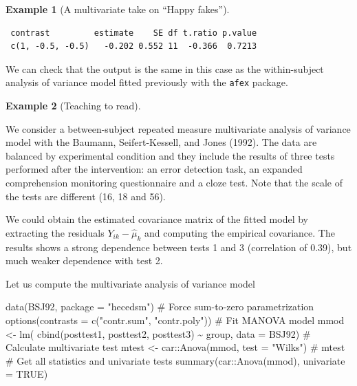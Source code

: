 \documentclass[
  11pt,
  letterpaper,
]{scrbook}
\newenvironment{Shaded}{\begin{snugshade}}{\end{snugshade}}
\newcommand{\AttributeTok}[1]{\textcolor[rgb]{0.40,0.45,0.13}{#1}}
\newcommand{\CommentTok}[1]{\textcolor[rgb]{0.37,0.37,0.37}{#1}}
\newcommand{\ConstantTok}[1]{\textcolor[rgb]{0.56,0.35,0.01}{#1}}
\newcommand{\FunctionTok}[1]{\textcolor[rgb]{0.28,0.35,0.67}{#1}}
\newcommand{\NormalTok}[1]{\textcolor[rgb]{0.00,0.23,0.31}{#1}}
\newcommand{\OtherTok}[1]{\textcolor[rgb]{0.00,0.23,0.31}{#1}}
\newcommand{\SpecialCharTok}[1]{\textcolor[rgb]{0.37,0.37,0.37}{#1}}
\newcommand{\StringTok}[1]{\textcolor[rgb]{0.13,0.47,0.30}{#1}}
\theoremstyle{definition}
\newtheorem{example}{Example}[chapter]
\theoremstyle{definition}
\theoremstyle{remark}
\begin{document}
\begin{example}[A multivariate take on ``Happy
fakes'']
\begin{verbatim}
 contrast         estimate    SE df t.ratio p.value
 c(1, -0.5, -0.5)   -0.202 0.552 11  -0.366  0.7213
\end{verbatim}

We can check that the output is the same in this case as the
within-subject analysis of variance model fitted previously with the
\texttt{afex} package.

\end{example}

\begin{example}[Teaching to
read]\protect\hypertarget{exm-baumann-multi}{}\label{exm-baumann-multi}

We consider a between-subject repeated measure multivariate analysis of
variance model with the Baumann, Seifert-Kessell, and Jones (1992). The
data are balanced by experimental condition and they include the results
of three tests performed after the intervention: an error detection
task, an expanded comprehension monitoring questionnaire and a cloze
test. Note that the scale of the tests are different (16, 18 and 56).

We could obtain the estimated covariance matrix of the fitted model by
extracting the residuals \(Y_{ik} - \widehat{\mu}_k\) and computing the
empirical covariance. The results shows a strong dependence between
tests 1 and 3 (correlation of 0.39), but much weaker dependence with
test 2.

Let us compute the multivariate analysis of variance model

\begin{Shaded}
\begin{Highlighting}[]
\FunctionTok{data}\NormalTok{(BSJ92, }\AttributeTok{package =} \StringTok{"hecedsm"}\NormalTok{)}
\CommentTok{\# Force sum{-}to{-}zero parametrization}
\FunctionTok{options}\NormalTok{(}\AttributeTok{contrasts =} \FunctionTok{c}\NormalTok{(}\StringTok{"contr.sum"}\NormalTok{, }\StringTok{"contr.poly"}\NormalTok{))}
\CommentTok{\# Fit MANOVA model}
\NormalTok{mmod }\OtherTok{\textless{}{-}} \FunctionTok{lm}\NormalTok{(}
  \FunctionTok{cbind}\NormalTok{(posttest1, posttest2, posttest3) }\SpecialCharTok{\textasciitilde{}}\NormalTok{ group,}
   \AttributeTok{data =}\NormalTok{ BSJ92)}
\CommentTok{\# Calculate multivariate test}
\NormalTok{mtest }\OtherTok{\textless{}{-}}\NormalTok{ car}\SpecialCharTok{::}\FunctionTok{Anova}\NormalTok{(mmod, }\AttributeTok{test =} \StringTok{"Wilks"}\NormalTok{)}
\CommentTok{\# mtest}
\CommentTok{\# Get all statistics and univariate tests}
\FunctionTok{summary}\NormalTok{(car}\SpecialCharTok{::}\FunctionTok{Anova}\NormalTok{(mmod), }\AttributeTok{univariate =} \ConstantTok{TRUE}\NormalTok{)}
\end{Highlighting}
\end{Shaded}


\end{example}
\end{document}
